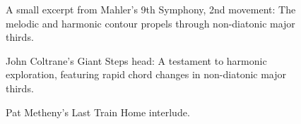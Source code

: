 \begin{figure}[ht]
    \centering
    \caption[Mahler's 9th Symphony, 2nd movement]{\small{A small excerpt from Mahler's 9th Symphony, 2nd movement: The melodic and harmonic contour propels through non-diatonic major thirds.}}
    \label{fig:mahler}
\end{figure}

\begin{figure}[ht]
    \centering
    \caption[Giant Steps]{\small{John Coltrane's Giant Steps head: A testament to harmonic exploration, featuring rapid chord changes in non-diatonic major thirds.}}
    \label{fig:giant_steps}
\end{figure}

\begin{figure}
    \centering
    \caption[Last Train Home]{\small{Pat Metheny's Last Train Home interlude.}}
    \label{fig:last_train}
\end{figure}
